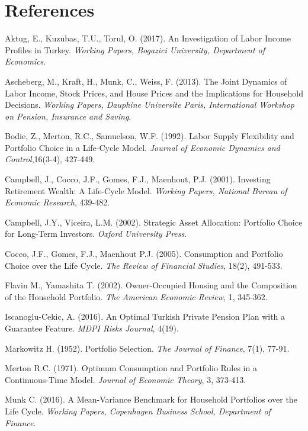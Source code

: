 \chapter*{References}

\begingroup
\singlespace
\begin{description}
\item Aktug, E., Kuzubas, T.U., Torul, O. (2017). An Investigation of Labor Income Profiles in Turkey. \textit{Working Papers, Bogazici University, Department of Economics}.
\item Ascheberg, M., Kraft, H., Munk, C., Weiss, F. (2013). The Joint Dynamics of Labor Income, Stock Prices, and House Prices and the Implications for Household Decisions. \textit{Working Papers, Dauphine Universite Paris, International Workshop on Pension, Insurance and Saving}.
\item Bodie, Z., Merton, R.C., Samuelson, W.F. (1992). Labor Supply Flexibility and Portfolio Choice in a Life-Cycle Model. \textit{Journal of Economic Dynamics and Control},16(3-4), 427-449. 
\item Campbell, J., Cocco, J.F., Gomes, F.J., Maenhout, P.J. (2001). Investing Retirement Wealth: A Life-Cycle Model. \textit{Working Papers, National Bureau of Economic Research}, 439-482.
\item Campbell, J.Y., Viceira, L.M. (2002). Strategic Asset Allocation: Portfolio Choice for Long-Term Investors. \textit{Oxford University Press}.
\item Cocco, J.F., Gomes, F.J., Maenhout P.J. (2005). Consumption and Portfolio Choice over the Life Cycle. \textit{The Review of Financial Studies}, 18(2), 491-533. 
\item Flavin M., Yamashita T. (2002). Owner-Occupied Housing and the Composition of the Household Portfolio. \textit{The American Economic Review}, 1, 345-362.
\item Iscanoglu-Cekic, A. (2016). An Optimal Turkish Private Pension Plan with a Guarantee Feature. \textit{MDPI Risks Journal}, 4(19).
\item Markowitz H. (1952). Portfolio Selection. \textit{The Journal of Finance}, 7(1), 77-91.
\item Merton R.C. (1971). Optimum Consumption and Portfolio Rules in a Continuous-Time Model. \textit{Journal of Economic Theory}, 3, 373-413.
\item Munk C. (2016). A Mean-Variance Benchmark for Household Portfolios over the Life Cycle. \textit{Working Papers, Copenhagen Business School, Department of Finance}.

\end{description}
